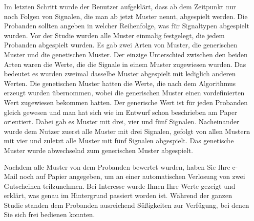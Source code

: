 Im letzten Schritt wurde der Benutzer aufgekl{\"a}rt, dass ab dem Zeitpunkt nur noch Folgen von Signalen, die man ab jetzt Muster nennt, abgespielt werden.
Die Probanden sollten angeben in welcher Reihenfolge, was f{\"u}r Signaltypen abgespielt wurden. 
Vor der Studie wurden alle Muster einmalig festgelegt, die jedem Probanden abgespielt wurden.
Es gab zwei Arten von Muster, die generischen Muster und die genetischen Muster. 
Der einzige Unterschied zwischen den beiden Arten waren die Werte, die die Signale in einem Muster zugewiesen wurden. 
Das bedeutet es wurden zweimal dasselbe Muster abgespielt mit lediglich anderen Werten. 
Die genetischen Muster hatten die Werte, die nach dem Algorithmus erzeugt wurden {\"u}bernommen, wobei die generischen Muster einen vordefinierten Wert zugewiesen bekommen hatten. 
Der generische Wert ist f{\"u}r jeden Probanden gleich gewesen und man hat sich wie im Entwurf schon beschrieben am Paper \cite{pescara2016ruttelflug} orientiert.
Dabei gab es Muster mit drei, vier und f{\"u}nf Signalen. 
Nacheinander wurde dem Nutzer zuerst alle Muster mit drei Signalen, gefolgt von allen Mustern mit vier und zuletzt alle Muster mit f{\"u}nf Signalen abgespielt. 
Das genetische Muster wurde abwechselnd zum generischen Muster abgespielt. 

Nachdem alle Muster von dem Probanden bewertet wurden, haben Sie Ihre e-Mail noch auf Papier angegeben, um an einer automatischen Verlosung von zwei Gutscheinen teilzunehmen. 
Bei Interesse wurde Ihnen Ihre Werte gezeigt und erkl{\"a}rt, was genau im Hintergrund passiert worden ist. 
W{\"a}hrend der ganzen Studie standen dem Probanden ausreichend S{\"u}{\ss}igkeiten zur Verf{\"u}gung, bei denen Sie sich frei bedienen konnten.

